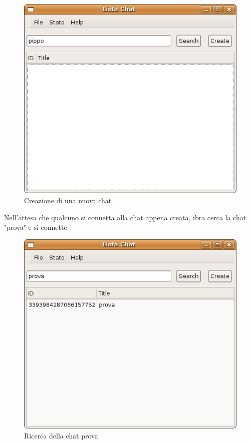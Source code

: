 \begin{figure}[H]
\begin{center}
\includegraphics[scale=0.5]{etc/crea_chat2.png}
\caption{Creazione di una nuova chat}
\label{crea\_chat2}
\end{center}
\end{figure}
Nell'attesa che qualcuno si connetta alla chat appena creata, ibra cerca la chat "prova" e si connette
\begin{figure}[H]
\begin{center}
\includegraphics[scale=0.5]{etc/ricerca_chat_2.png}
\caption{Ricerca della chat prova}
\label{ricerca\_chat\_2}
\end{center}
\end{figure}
